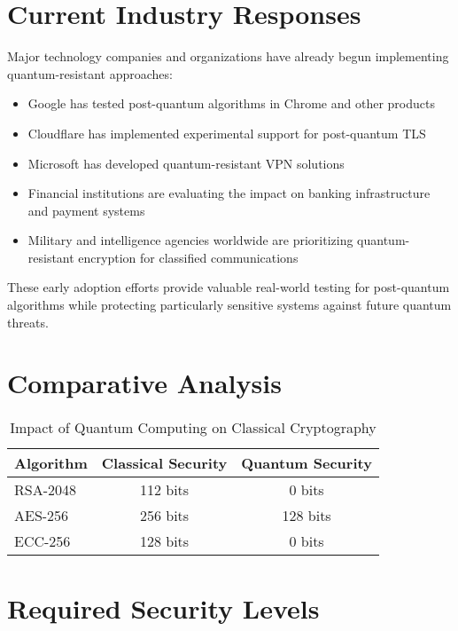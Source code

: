\section{Current Industry Responses}
Major technology companies and organizations have already begun implementing quantum-resistant approaches:
\begin{itemize}
    \item Google has tested post-quantum algorithms in Chrome and other products
    \item Cloudflare has implemented experimental support for post-quantum TLS
    \item Microsoft has developed quantum-resistant VPN solutions
    \item Financial institutions are evaluating the impact on banking infrastructure and payment systems
    \item Military and intelligence agencies worldwide are prioritizing quantum-resistant encryption for classified communications
\end{itemize}

These early adoption efforts provide valuable real-world testing for post-quantum algorithms while protecting particularly sensitive systems against future quantum threats.

\section{Comparative Analysis}\label{sec:comparison}

\begin{table}[h]
    \centering
    \caption{Impact of Quantum Computing on Classical Cryptography}
    \label{tab:quantum_impact}
    \begin{tabular}{|l|c|c|}
        \hline
        \textbf{Algorithm} & \textbf{Classical Security} & \textbf{Quantum Security} \\
        \hline
        RSA-2048 & 112 bits & 0 bits \\
        AES-256 & 256 bits & 128 bits \\
        ECC-256 & 128 bits & 0 bits \\
        \hline
    \end{tabular}
\end{table}

\section{Required Security Levels}\label{sec:security_levels}

